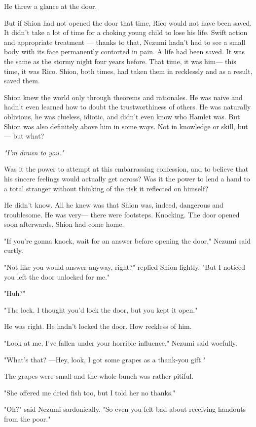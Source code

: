 He threw a glance at the door.

But if Shion had not opened the door that time, Rico would not have been
saved. It didn't take a lot of time for a choking young child to lose
his life. Swift action and appropriate treatment --- thanks to that,
Nezumi hadn't had to see a small body with its face permanently
contorted in pain. A life had been saved. It was the same as the stormy
night four years before. That time, it was him--- this time, it was Rico.
Shion, both times, had taken them in recklessly and as a result, saved
them.

Shion knew the world only through theorems and rationales. He was naive
and hadn't even learned how to doubt the trustworthiness of others. He
was naturally oblivious, he was clueless, idiotic, and didn't even know
who Hamlet was. But Shion was also definitely above him in some ways.
Not in knowledge or skill, but --- but what?

\emph{"I'm drawn to you."}

Was it the power to attempt at this embarrassing confession, and to
believe that his sincere feelings would actually get across? Was it the
power to lend a hand to a total stranger without thinking of the risk it
reflected on himself?

He didn't know. All he knew was that Shion was, indeed, dangerous and
troublesome. He was very--- there were footsteps. Knocking. The door
opened soon afterwards. Shion had come home.

"If you're gonna knock, wait for an answer before opening the door,"
Nezumi said curtly.

"Not like you would answer anyway, right?" replied Shion lightly. "But I
noticed you left the door unlocked for me."

"Huh?"

"The lock. I thought you'd lock the door, but you kept it open."

He was right. He hadn't locked the door. How reckless of him.

"Look at me, I've fallen under your horrible influence," Nezumi said
woefully.

"What's that? ---Hey, look, I got some grapes as a thank-you gift."

The grapes were small and the whole bunch was rather pitiful.

"She offered me dried fish too, but I told her no thanks."

"Oh?" said Nezumi sardonically. "So even you felt bad about receiving
handouts from the poor."

